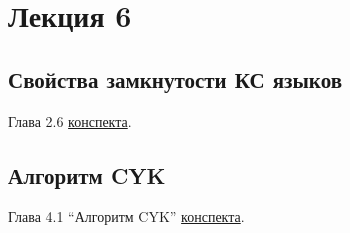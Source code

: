 \section{Лекция 6}
 
\subsection{Свойства замкнутости КС языков}

Глава 2.6 \href{https://github.com/YaccConstructor/articles/blob/master/InProgress/Formal_langs_CFPQ_course_notes/Formal_lang_CFPQ_course_notes.pdf}{конспекта}.

\subsection{Алгоритм CYK}

Глава 4.1 ``Алгоритм CYK'' \href{https://github.com/YaccConstructor/articles/blob/master/InProgress/Formal_langs_CFPQ_course_notes/Formal_lang_CFPQ_course_notes.pdf}{конспекта}.